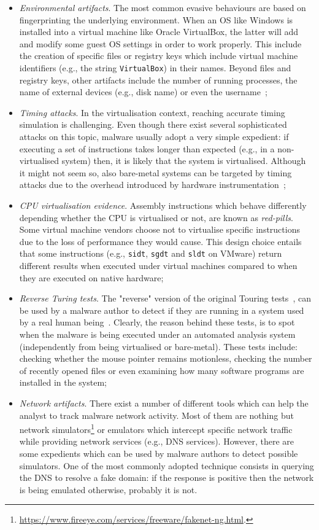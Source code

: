 \documentclass[LaM,binding=0.6cm]{sapthesis}
\begin{document}
\begin{itemize}
\item \textit{Environmental artifacts}. The most common evasive behaviours are based on fingerprinting the underlying environment. When an OS like Windows is installed into a virtual machine like Oracle VirtualBox, the latter will add and modify some guest OS settings in order to work properly. This include the creation of specific files or registry keys which include virtual machine identifiers (e.g., the string \texttt{VirtualBox}) in their names. Beyond files and registry keys, other artifacts include the number of running processes, the name of external devices (e.g., disk name) or even the username~\cite{lindorfer2011detecting};
\item \textit{Timing attacks}. In the virtualisation context, reaching accurate timing simulation is challenging. Even though there exist several sophisticated attacks on this topic, malware usually adopt a very simple expedient: if executing a set of instructions takes longer than expected (e.g., in a non-virtualised system) then, it is likely that the system is virtualised. Although it might not seem so, also bare-metal systems can be targeted by timing attacks due to the overhead introduced by hardware instrumentation~\cite{spensky2016phi};
\item \textit{CPU virtualisation evidence}. Assembly instructions which behave differently depending whether the CPU is virtualised or not, are known as \textit{red-pills}. Some virtual machine vendors choose not to virtualise specific instructions due to the loss of performance they would cause. This design choice entails that some instructions (e.g., \texttt{sidt}, \texttt{sgdt} and \texttt{sldt} on VMware) return different results when executed under virtual machines compared to when they are executed on native hardware;
\item \textit{Reverse Turing tests}. The "reverse" version of the original Touring tests~\cite{turing2009computing}, can be used by a malware author to detect if they are running in a system used by a real human being~\cite{miramirkhani2017spotless}. Clearly, the reason behind these tests, is to spot when the malware is being executed under an automated analysis system (independently from being virtualised or bare-metal). These tests include: checking whether the mouse pointer remains motionless, checking the number of recently opened files or even examining how many software programs are installed in the system;
\item \textit{Network artifacts}. There exist a number of different tools which can help the analyst to track malware network activity. Most of them are nothing but network simulators\footnote{\url{https://www.fireeye.com/services/freeware/fakenet-ng.html}.} or emulators which intercept specific network traffic while providing network services (e.g., DNS services). However, there are some expedients which can be used by malware authors to detect possible simulators. One of the most commonly adopted technique consists in querying the DNS to resolve a fake domain: if the response is positive then the network is being emulated otherwise, probably it is not.
\end{itemize}
\end{document}
